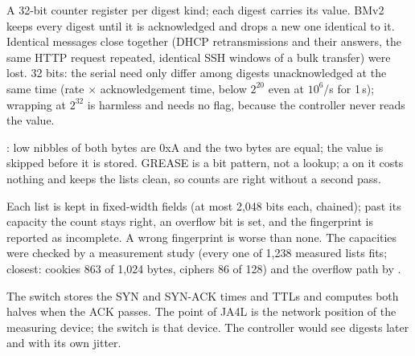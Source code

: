 {A 32-bit counter register per digest kind; each digest carries its value.}
{BMv2 keeps every digest until it is acknowledged and drops a new one identical to it. Identical messages close
together (DHCP retransmissions and their answers, the same HTTP request repeated, identical SSH windows of a bulk
transfer) were lost. 32 bits: the serial need only differ among digests unacknowledged at the same time (rate
$\times$ acknowledgement time, below $2^{20}$ even at $10^6$/s for 1\,s); wrapping at $2^{32}$ is harmless and needs
no flag, because the controller never reads the value.}

{: low nibbles of both bytes are 0xA and the two bytes are equal; the value is skipped before
it is stored.}
{GREASE is a bit pattern, not a lookup; a  on it costs nothing and keeps the lists clean, so counts
are right without a second pass.}

{Each list is kept in fixed-width fields (at most 2,048 bits each, chained); past its capacity the count stays
right, an overflow bit is set, and the fingerprint is reported as incomplete.}
{A wrong fingerprint is worse than none. The capacities were checked by a measurement study (every one of 1,238
measured lists fits; closest: cookies 863 of 1,024 bytes, ciphers 86 of 128) and the overflow path by
.}

{The switch stores the SYN and SYN-ACK times and TTLs and computes both halves when the ACK passes.}
{The point of JA4L is the network position of the measuring device; the switch is that device. The controller
would see digests later and with its own jitter.}


